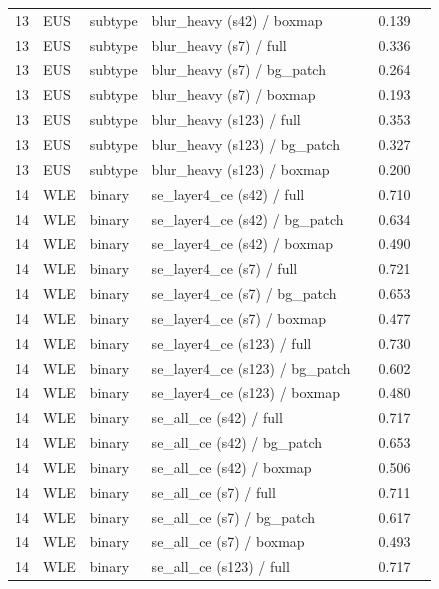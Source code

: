 \begin{longtable}{cL{1.1cm}L{1.5cm}L{5.6cm}ccc}
13 & EUS & subtype & blur\_heavy (s42) / boxmap & \nl{} & 0.139 & \nl{} \\
13 & EUS & subtype & blur\_heavy (s7) / full & \nl{} & 0.336 & \nl{} \\
13 & EUS & subtype & blur\_heavy (s7) / bg\_patch & \nl{} & 0.264 & \nl{} \\
13 & EUS & subtype & blur\_heavy (s7) / boxmap & \nl{} & 0.193 & \nl{} \\
13 & EUS & subtype & blur\_heavy (s123) / full & \nl{} & 0.353 & \nl{} \\
13 & EUS & subtype & blur\_heavy (s123) / bg\_patch & \nl{} & 0.327 & \nl{} \\
13 & EUS & subtype & blur\_heavy (s123) / boxmap & \nl{} & 0.200 & \nl{} \\
14 & WLE & binary & se\_layer4\_ce (s42) / full & \nl{} & 0.710 & \nl{} \\
14 & WLE & binary & se\_layer4\_ce (s42) / bg\_patch & \nl{} & 0.634 & \nl{} \\
14 & WLE & binary & se\_layer4\_ce (s42) / boxmap & \nl{} & 0.490 & \nl{} \\
14 & WLE & binary & se\_layer4\_ce (s7) / full & \nl{} & 0.721 & \nl{} \\
14 & WLE & binary & se\_layer4\_ce (s7) / bg\_patch & \nl{} & 0.653 & \nl{} \\
14 & WLE & binary & se\_layer4\_ce (s7) / boxmap & \nl{} & 0.477 & \nl{} \\
14 & WLE & binary & se\_layer4\_ce (s123) / full & \nl{} & 0.730 & \nl{} \\
14 & WLE & binary & se\_layer4\_ce (s123) / bg\_patch & \nl{} & 0.602 & \nl{} \\
14 & WLE & binary & se\_layer4\_ce (s123) / boxmap & \nl{} & 0.480 & \nl{} \\
14 & WLE & binary & se\_all\_ce (s42) / full & \nl{} & 0.717 & \nl{} \\
14 & WLE & binary & se\_all\_ce (s42) / bg\_patch & \nl{} & 0.653 & \nl{} \\
14 & WLE & binary & se\_all\_ce (s42) / boxmap & \nl{} & 0.506 & \nl{} \\
14 & WLE & binary & se\_all\_ce (s7) / full & \nl{} & 0.711 & \nl{} \\
14 & WLE & binary & se\_all\_ce (s7) / bg\_patch & \nl{} & 0.617 & \nl{} \\
14 & WLE & binary & se\_all\_ce (s7) / boxmap & \nl{} & 0.493 & \nl{} \\
14 & WLE & binary & se\_all\_ce (s123) / full & \nl{} & 0.717 & \nl{} \\

\end{longtable}
